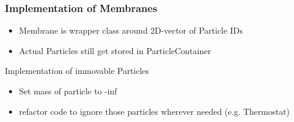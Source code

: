 
\begin{frame}
	\frametitle{\LARGE Implementation of Membranes}
	\large
	\begin{itemize}
		\item Membrane is wrapper class around 2D-vector of Particle IDs
		\item Actual Particles still get stored in ParticleContainer
	\end{itemize}

	\vspace{1cm}

	\LARGE
	Implementation of immovable Particles
	\large
	\begin{itemize}
		\item Set mass of particle to -inf
		\item refactor code to ignore those particles wherever needed (e.g. Thermostat)
	\end{itemize}
	
\end{frame}


